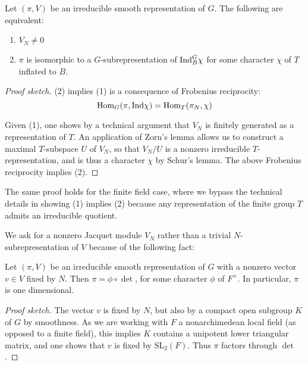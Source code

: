 \begin{prop}
    Let $(\pi,V)$ be an irreducible smooth representation of $G$. The following are equivalent:
    \begin{enumerate}
        \item $V_N \neq 0$
        \item $\pi$ is isomorphic to a $G$-subrepresentation of $\mathrm{Ind}_B^G \chi$ for some character $\chi$ of $T$ inflated to $B$.
    \end{enumerate}
\end{prop}
\begin{proof}[Proof sketch]
    (2) implies (1) is a consequence of Frobenius reciprocity:
    $$\mathrm{Hom}_G(\pi,\mathrm{Ind} \chi) = \mathrm{Hom}_T(\pi_N,\chi)$$

    Given (1), one shows by a technical argument that $V_N$ is finitely generated as a representation of $T$. An application of Zorn's lemma allows us to construct a maximal $T$-subspace $U$ of $V_N$, so that $V_N/U$ is a nonzero irreducible $T$-representation, and is thus a character $\chi$ by Schur's lemma. The above Frobenius reciprocity implies (2).
\end{proof}

\begin{rem}
    The same proof holds for the finite field case, where we bypass the technical details in showing (1) implies (2) because any representation of the finite group $T$ admits an irreducible quotient.
\end{rem}

\begin{rem}
    We ask for a nonzero Jacquet module $V_N$ rather than a trivial $N$-subrepresentation of $V$ because of the following fact:
\end{rem}

\begin{lemma}
    Let $(\pi,V)$ be an irreducible smooth representation of $G$ with a nonzero vector $v\in V$ fixed by $N$. Then $\pi = \phi \circ \det$, for some character $\phi$ of $F^\times$. In particular, $\pi$ is one dimensional.
\end{lemma}
\begin{proof}[Proof sketch]
    The vector $v$ is fixed by $N$, but also by a compact open subgroup $K$ of $G$ by smoothness. As we are working with $F$ a nonarchimedean local field (as opposed to a finite field), this implies $K$ contains a unipotent lower triangular matrix, and one shows that $v$ is fixed by $\mathrm{SL}_2(F)$. Thus $\pi$ factors through $\det$.
\end{proof}


